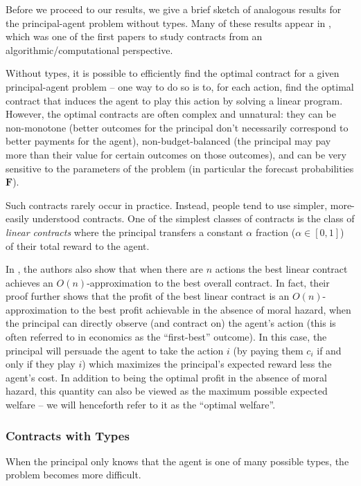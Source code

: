 \documentclass{article}
\newcommand{\ForecastTensor}{\bm{F}}
\begin{document}
Before we proceed to our results, we give a brief sketch of analogous results for the principal-agent 
problem without types. Many of these results appear in \cite{dutting2019simple}, which was one of the first papers to 
study contracts from an algorithmic/computational perspective.

Without types, it is possible to efficiently find the optimal contract for a given principal-agent problem 
-- one way to do so is to, for each action, find the optimal contract that induces the agent to play this 
action by solving a linear program. However, the optimal contracts 
are often complex and unnatural: they can be non-monotone (better outcomes for the principal don't necessarily correspond to better payments for the agent), non-budget-balanced (the principal may pay more than their value for certain outcomes on those outcomes), and can be very sensitive to the parameters of the problem (in particular the forecast probabilities $\ForecastTensor$). 

Such contracts rarely occur in practice. Instead, people tend to use simpler, more-easily understood contracts. One of the simplest classes of contracts is the class of \emph{linear contracts} where the principal transfers a constant $\alpha$ fraction ($\alpha \in [0, 1]$) of their total reward to the agent. 

In \cite{dutting2019simple}, the authors also show that when there are $n$ actions the best linear contract achieves an $O(n)$-approximation to the best overall contract. In fact, their proof further shows that the profit of the best linear contract is an $O(n)$-approximation to the best profit achievable in the absence of moral hazard, when the principal can directly observe (and contract on) the agent's action (this is often referred  to in economics as the ``first-best'' outcome). In this case, the principal will persuade the agent to take the action $i$ (by paying them $c_i$ if and only if they play $i$) which maximizes the principal's expected reward less the agent's cost. In addition to being the optimal profit in the absence of moral hazard, this quantity can also be viewed as the maximum possible expected welfare -- we will henceforth refer to it as the ``optimal welfare''.  

\subsubsection*{Contracts with Types}

When the principal only knows that the agent is one of many possible types, the problem becomes more difficult.
\end{document}

